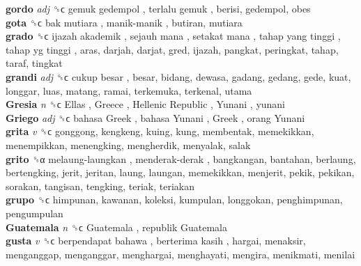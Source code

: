 \textbf{gordo} \emph{adj}  ␝ϲ   gemuk gedempol ,  terlalu gemuk , berisi, gedempol, obes  \\
\textbf{gota} ␝ϲ   bak mutiara ,  manik-manik , butiran, mutiara  \\
\textbf{grado} ␝ϲ   ijazah akademik ,  sejauh mana ,  setakat mana ,  tahap yang tinggi ,  tahap yg tinggi , aras, darjah, darjat, gred, ijazah, pangkat, peringkat, tahap, taraf, tingkat  \\
\textbf{grandi} \emph{adj}  ␝ϲ   cukup besar , besar, bidang, dewasa, gadang, gedang, gede, kuat, longgar, luas, matang, ramai, terkemuka, terkenal, utama  \\
\textbf{Gresia} \emph{n}  ␝ϲ   Ellas ,  Greece ,  Hellenic Republic ,  Yunani , yunani  \\
\textbf{Griego} \emph{adj}  ␝ϲ   bahasa Greek ,  bahasa Yunani ,  Greek ,  orang Yunani   \\
\textbf{grita} \emph{v}  ␝ϲ  gonggong, kengkeng, kuing, kung, membentak, memekikkan, menempikkan, menengking, mengherdik, menyalak, salak  \\
\textbf{grito} ␝α   melaung-laungkan ,  menderak-derak , bangkangan, bantahan, berlaung, bertengking, jerit, jeritan, laung, laungan, memekikkan, menjerit, pekik, pekikan, sorakan, tangisan, tengking, teriak, teriakan  \\
\textbf{grupo} ␝ϲ  himpunan, kawanan, koleksi, kumpulan, longgokan, penghimpunan, pengumpulan  \\
\textbf{Guatemala} \emph{n}  ␝ϲ   Guatemala ,  republik Guatemala   \\
\textbf{gusta} \emph{v}  ␝ϲ   berpendapat bahawa ,  berterima kasih , hargai, menaksir, menganggap, menganggar, menghargai, menghayati, mengira, menikmati, menilai  \\
